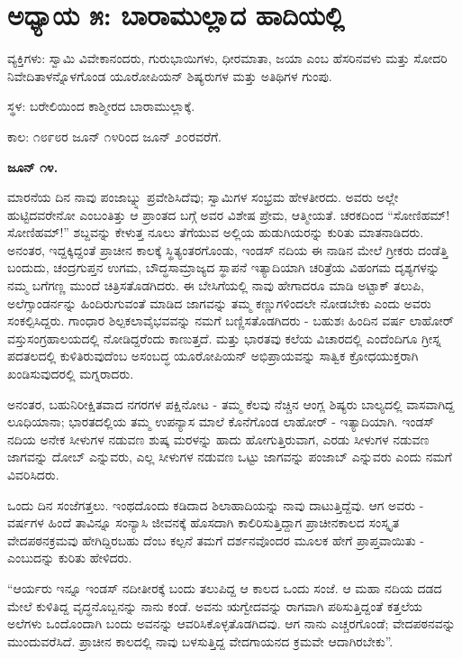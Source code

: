 
\chapter{ಅಧ್ಯಾಯ ೫: ಬಾರಾಮುಲ್ಲಾದ ಹಾದಿಯಲ್ಲಿ}

ವ್ಯಕ್ತಿಗಳು: ಸ್ವಾಮಿ ವಿವೇಕಾನಂದರು, ಗುರುಭಾಯಿಗಳು, ಧೀರಮಾತಾ, ಜಯಾ ಎಂಬ ಹೆಸರಿನವಳು ಮತ್ತು ಸೋದರಿ ನಿವೇದಿತಾಳನ್ನೊಳಗೊಂಡ ಯೂರೋಪಿಯನ್ ಶಿಷ್ಯರುಗಳ ಮತ್ತು ಅತಿಥಿಗಳ ಗುಂಪು.

ಸ್ಥಳ: ಬರೇಲಿಯಿಂದ ಕಾಶ್ಮೀರದ ಬಾರಾಮುಲ್ಲಾಕ್ಕೆ.

ಕಾಲ: ೧೮೯೮ರ ಜೂನ್ ೧೪ರಿಂದ ಜೂನ್ ೨೦ರವರೆಗೆ.

\textbf{ಜೂನ್ ೧೪.}

ಮಾರನೆಯ ದಿನ ನಾವು ಪಂಜಾಬ್ನ್ನು ಪ್ರವೇಶಿಸಿದೆವು; ಸ್ವಾಮಿಗಳ ಸಂಭ್ರಮ ಹೇಳತೀರದು. ಅವರು ಅಲ್ಲೇ ಹುಟ್ಟಿದವರೇನೋ ಎಂಬಂತಿತ್ತು ಆ ಪ್ರಾಂತದ ಬಗ್ಗೆ ಅವರ ವಿಶೇಷ ಪ್ರೇಮ, ಆತ್ಮೀಯತೆ. ಚರಕದಿಂದ “ಸೋಣಿಹಮ್​! ಸೋಣಿಹಮ್​!” ಶಬ್ದವನ್ನು ಕೇಳುತ್ತ ನೂಲು ತೆಗೆಯುವ ಅಲ್ಲಿಯ ಹುಡುಗಿಯರನ್ನು ಕುರಿತು ಮಾತನಾಡಿದರು. ಅನಂತರ, ಇದ್ದಕ್ಕಿದ್ದಂತೆ ಪ್ರಾಚೀನ ಕಾಲಕ್ಕೆ ಸ್ಥಿತ್ಯಂತರಗೊಂಡು, ಇಂಡಸ್ ನದಿಯ ಈ ನಾಡಿನ ಮೇಲೆ ಗ್ರೀಕರು ದಂಡೆತ್ತಿ ಬಂದುದು, ಚಂದ್ರಗುಪ್ತನ ಉಗಮ, ಬೌದ್ಧಸಾಮ್ರಾಜ್ಯದ ಸ್ಥಾಪನೆ ಇತ್ಯಾದಿಯಾಗಿ ಚರಿತ್ರೆಯ ವಿಹಂಗಮ ದೃಶ್ಯಗಳನ್ನು ನಮ್ಮ ಬಗೆಗಣ್ಣ ಮುಂದೆ ಚಿತ್ರಿಸತೊಡಗಿದರು. ಈ ಬೇಸಿಗೆಯಲ್ಲಿ ನಾವು ಹೇಗಾದರೂ ಮಾಡಿ ಅಟ್ಟಾಕ್ ತಲುಪಿ, ಅಲೆಗ್ಸಾಂಡರ್ನನ್ನು ಹಿಂದಿರುಗುವಂತೆ ಮಾಡಿದ ಜಾಗವನ್ನು ತಮ್ಮ ಕಣ್ಣುಗಳಿಂದಲೇ ನೋಡಬೇಕು ಎಂದು ಅವರು ಸಂಕಲ್ಪಿಸಿದ್ದರು. ಗಾಂಧಾರ ಶಿಲ್ಪಕಲಾವೈಭವವನ್ನು ನಮಗೆ ಬಣ್ಣಿಸತೊಡಗಿದರು - ಬಹುಶಃ ಹಿಂದಿನ ವರ್ಷ ಲಾಹೋರ್ ವಸ್ತುಸಂಗ್ರಹಾಲಯದಲ್ಲಿ ನೋಡಿದ್ದರೆಂದು ಕಾಣುತ್ತದೆ. ಮತ್ತು ಭಾರತವು ಕಲೆಯ ವಿಚಾರದಲ್ಲಿ ಎಂದೆಂದಿಗೂ ಗ್ರೀಸ್ನ ಪದತಲದಲ್ಲಿ ಕುಳಿತಿರುವುದೆಂಬ ಅಸಂಬದ್ಧ ಯೂರೋಪಿಯನ್ ಅಭಿಪ್ರಾಯವನ್ನು ಸಾತ್ವಿಕ ಕ್ರೋಧಯುಕ್ತರಾಗಿ ಖಂಡಿಸುವುದರಲ್ಲಿ ಮಗ್ನರಾದರು.

ಅನಂತರ, ಬಹುನಿರೀಕ್ಷಿತವಾದ ನಗರಗಳ ಪಕ್ಷಿನೋಟ - ತಮ್ಮ ಕೆಲವು ನೆಚ್ಚಿನ ಆಂಗ್ಲ ಶಿಷ್ಯರು ಬಾಲ್ಯದಲ್ಲಿ ವಾಸವಾಗಿದ್ದ ಲೂಧಿಯಾನಾ; ಭಾರತದಲ್ಲಿಯ ತಮ್ಮ ಉಪನ್ಯಾಸ ಮಾಲೆ ಕೊನೆಗೊಂಡ ಲಾಹೋರ್ - ಇತ್ಯಾದಿಯಾಗಿ. ಇಂಡಸ್ ನದಿಯ ಅನೇಕ ಸೀಳುಗಳ ನಡುವಣ ಶುಷ್ಕ ಮರಳನ್ನು ಹಾದು ಹೋಗುತ್ತಿರುವಾಗ, ಎರಡು ಸೀಳುಗಳ ನಡುವಣ ಜಾಗವನ್ನು ದೋಬ್ ಎನ್ನುವರು, ಎಲ್ಲ ಸೀಳುಗಳ ನಡುವಣ ಒಟ್ಟು ಜಾಗವನ್ನು ಪಂಜಾಬ್ ಎನ್ನುವರು ಎಂದು ನಮಗೆ ವಿವರಿಸಿದರು.

ಒಂದು ದಿನ ಸಂಜೆಗತ್ತಲು. ಇಂಥದೊಂದು ಕಡಿದಾದ ಶಿಲಾಹಾದಿಯನ್ನು ನಾವು ದಾಟುತ್ತಿದ್ದೆವು. ಆಗ ಅವರು - ವರ್ಷಗಳ ಹಿಂದೆ ತಾವಿನ್ನೂ ಸಂನ್ಯಾಸಿ ಜೀವನಕ್ಕೆ ಹೊಸದಾಗಿ ಕಾಲಿರಿಸುತ್ತಿದ್ದಾಗ ಪ್ರಾಚೀನಕಾಲದ ಸಂಸ್ಕೃತ ವೇದಪಠನಕ್ರಮವು ಹೇಗಿದ್ದಿರಬಹು ದೆಂಬ ಕಲ್ಪನೆ ತಮಗೆ ದರ್ಶನವೊಂದರ ಮೂಲಕ ಹೇಗೆ ಪ್ರಾಪ್ತವಾಯಿತು - ಎಂಬುದನ್ನು ಕುರಿತು ಹೇಳಿದರು.

“ಆರ್ಯರು ಇನ್ನೂ ಇಂಡಸ್ ನದೀತೀರಕ್ಕೆ ಬಂದು ತಲುಪಿದ್ದ ಆ ಕಾಲದ ಒಂದು ಸಂಜೆ. ಆ ಮಹಾ ನದಿಯ ದಡದ ಮೇಲೆ ಕುಳಿತಿದ್ದ ವೃದ್ಧನೊಬ್ಬನನ್ನು ನಾನು ಕಂಡೆ. ಅವನು ಋಗ್ವೇದವನ್ನು ರಾಗವಾಗಿ ಪಠಿಸುತ್ತಿದ್ದಂತೆ ಕತ್ತಲೆಯ ಅಲೆಗಳು ಒಂದೊಂದಾಗಿ ಬಂದು ಅವನನ್ನು ಆವರಿಸಿಕೊಳ್ಳತೊಡಗಿದವು. ಆಗ ನಾನು ಎಚ್ಚರಗೊಂಡೆ; ವೇದಪಠನವನ್ನು ಮುಂದುವರೆಸಿದೆ. ಪ್ರಾಚೀನ ಕಾಲದಲ್ಲಿ ನಾವು ಬಳಸುತ್ತಿದ್ದ ವೇದಗಾಯನದ ಕ್ರಮವೇ ಆದಾಗಿರಬೇಕು”.

